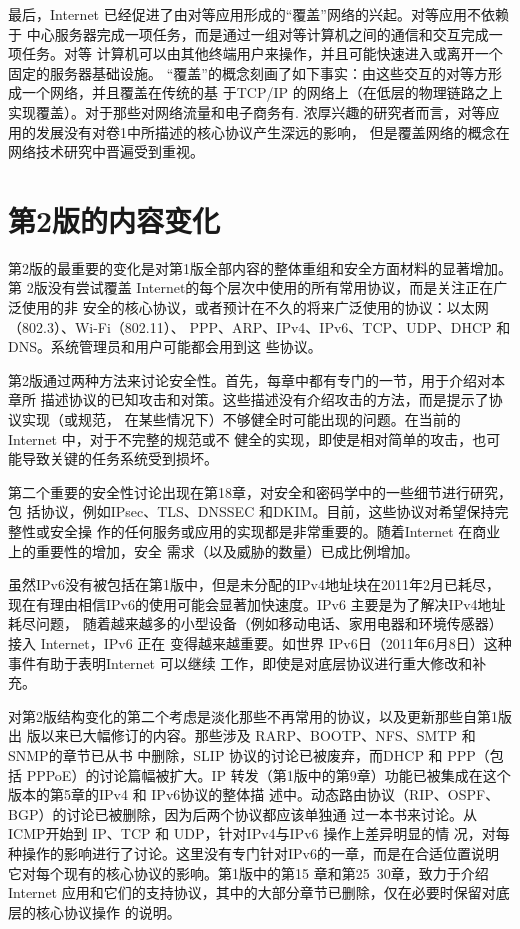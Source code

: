 最后，Internet 已经促进了由对等应用形成的“覆盖”网络的兴起。对等应用不依赖于
中心服务器完成一项任务，而是通过一组对等计算机之间的通信和交互完成一项任务。对等
计算机可以由其他终端用户来操作，并且可能快速进入或离开一个固定的服务器基础设施。
“覆盖”的概念刻画了如下事实：由这些交互的对等方形成一个网络，并且覆盖在传统的基
于TCP/IP 的网络上（在低层的物理链路之上实现覆盖）。对于那些对网络流量和电子商务有.
浓厚兴趣的研究者而言，对等应用的发展没有对卷1中所描述的核心协议产生深远的影响，
但是覆盖网络的概念在网络技术研究中晋遍受到重视。

\section*{第2版的内容变化}
第2版的最重要的变化是对第1版全部内容的整体重组和安全方面材料的显著增加。第
2版没有尝试覆盖 Internet的每个层次中使用的所有常用协议，而是关注正在广泛使用的非
安全的核心协议，或者预计在不久的将来广泛使用的协议：以太网（802.3）、Wi-Fi（802.11）、
PPP、ARP、IPv4、IPv6、TCP、UDP、DHCP 和DNS。系统管理员和用户可能都会用到这
些协议。

第2版通过两种方法来讨论安全性。首先，每章中都有专门的一节，用于介绍对本章所
描述协议的已知攻击和对策。这些描述没有介绍攻击的方法，而是提示了协议实现（或规范，
在某些情况下）不够健全时可能出现的问题。在当前的 Internet 中，对于不完整的规范或不
健全的实现，即使是相对简单的攻击，也可能导致关键的任务系统受到损坏。

第二个重要的安全性讨论出现在第18章，对安全和密码学中的一些细节进行研究，包
括协议，例如IPsec、TLS、DNSSEC 和DKIM。目前，这些协议对希望保持完整性或安全操
作的任何服务或应用的实现都是非常重要的。随着Internet 在商业上的重要性的增加，安全
需求（以及威胁的数量）已成比例增加。

虽然IPv6没有被包括在第1版中，但是未分配的IPv4地址块在2011年2月已耗尽，
现在有理由相信IPv6的使用可能会显著加快速度。IPv6 主要是为了解决IPv4地址耗尽问题，
随着越来越多的小型设备（例如移动电话、家用电器和环境传感器）接入 Internet，IPv6 正在
变得越来越重要。如世界 IPv6日（2011年6月8日）这种事件有助于表明Internet 可以继续
工作，即使是对底层协议进行重大修改和补充。

对第2版结构变化的第二个考虑是淡化那些不再常用的协议，以及更新那些自第1版出
版以来已大幅修订的内容。那些涉及 RARP、BOOTP、NFS、SMTP 和SNMP的章节已从书
中删除，SLIP 协议的讨论已被废弃，而DHCP 和 PPP（包括 PPPoE）的讨论篇幅被扩大。IP
转发（第1版中的第9章）功能已被集成在这个版本的第5章的IPv4 和 IPv6协议的整体描
述中。动态路由协议（RIP、OSPF、BGP）的讨论已被删除，因为后两个协议都应该单独通
过一本书来讨论。从ICMP开始到 IP、TCP 和 UDP，针对IPv4与IPv6 操作上差异明显的情
况，对每种操作的影响进行了讨论。这里没有专门针对IPv6的一章，而是在合适位置说明
它对每个现有的核心协议的影响。第1版中的第15 章和第25~30章，致力于介绍 Internet
应用和它们的支持协议，其中的大部分章节已删除，仅在必要时保留对底层的核心协议操作
的说明。

